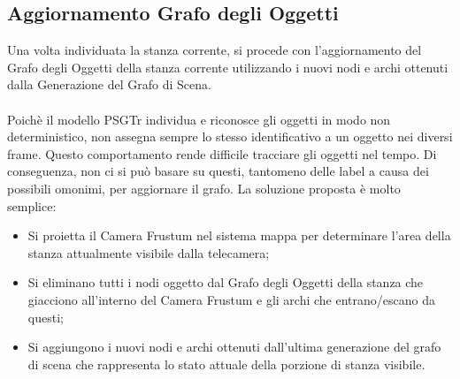 \subsection{Aggiornamento Grafo degli Oggetti}
Una volta individuata la stanza corrente, si procede con l'aggiornamento del Grafo degli Oggetti della stanza corrente utilizzando i nuovi nodi e archi ottenuti dalla Generazione del Grafo di Scena.\\\\
Poichè il modello PSGTr individua e riconosce gli oggetti in modo non deterministico,  non assegna sempre lo stesso identificativo a un oggetto nei diversi frame. Questo comportamento rende difficile tracciare gli oggetti nel tempo. Di conseguenza, non ci si può basare su questi, tantomeno delle label a causa dei possibili omonimi, per aggiornare il grafo. La soluzione proposta è molto semplice:
\begin{itemize}
	\item Si proietta il Camera Frustum nel sistema mappa per determinare l'area della stanza attualmente visibile dalla telecamera;
	\item Si eliminano tutti i nodi oggetto dal Grafo degli Oggetti della stanza che giacciono all'interno del Camera Frustum e gli archi che entrano/escano da questi;
	\item Si aggiungono i nuovi nodi e archi ottenuti dall'ultima generazione del grafo di scena che rappresenta lo stato attuale della porzione di stanza visibile.
\end{itemize}

